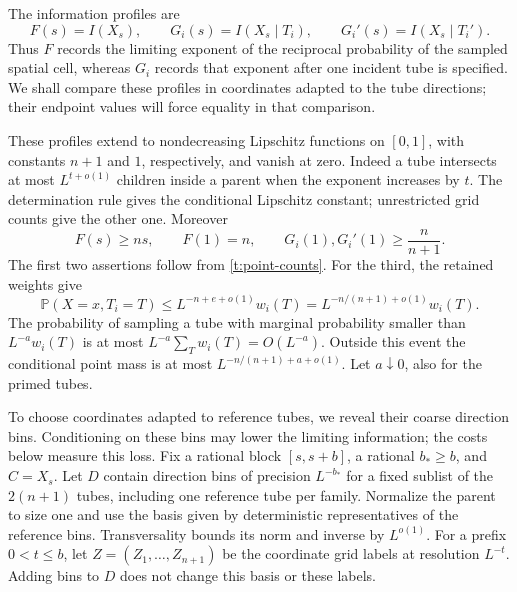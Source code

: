 The information profiles are
\[
 F(s)=I(X_s),\qquad G_i(s)=I(X_s\mid T_i),\qquad
 G_i'(s)=I(X_s\mid T_i').
\]
Thus $F$ records the limiting exponent of the reciprocal probability
of the sampled spatial cell, whereas $G_i$ records that exponent after
one incident tube is specified.  We shall compare these profiles in
coordinates adapted to the tube directions; their endpoint values
will force equality in that comparison.

These profiles extend to nondecreasing Lipschitz functions on $[0,1]$,
with constants $n+1$ and $1$, respectively, and vanish at zero.  Indeed
a tube intersects at most $L^{t+o(1)}$ children inside a parent when
the exponent increases by $t$.  The determination rule gives the
conditional Lipschitz constant; unrestricted grid counts give the
other one.  Moreover
\begin{equation}\label{t:profile-endpoints}
 F(s)\ge ns,\qquad F(1)=n,\qquad
 G_i(1),G_i'(1)\ge\frac n{n+1}.
\end{equation}
The first two assertions follow from \eqref{t:point-counts}.  For the
third, the retained weights give
\[
 \mathbb P(X=x,T_i=T)\le L^{-n+e+o(1)}w_i(T)
       =L^{-n/(n+1)+o(1)}w_i(T).
\]
The probability of sampling a tube with marginal probability smaller
than $L^{-a}w_i(T)$ is at most $L^{-a}\sum_Tw_i(T)=O(L^{-a})$.
Outside this event the conditional point mass is at most
$L^{-n/(n+1)+a+o(1)}$.  Let $a\downarrow0$, also for the primed tubes.

To choose coordinates adapted to reference tubes, we reveal their
coarse direction bins.  Conditioning on these bins may lower the
limiting information; the costs below measure this loss.
Fix a rational block $[s,s+b]$, a rational $b_*\ge b$, and $C=X_s$.
Let $D$ contain direction bins of precision $L^{-b_*}$ for a fixed
sublist of the $2(n+1)$ tubes, including one reference tube per family.
Normalize the parent to size one and use the basis given by deterministic
representatives of the reference bins.  Transversality bounds its norm
and inverse by $L^{o(1)}$.  For a prefix $0<t\le b$, let
$Z=(Z_1,\ldots,Z_{n+1})$ be the coordinate grid labels at resolution
$L^{-t}$.  Adding bins to $D$ does not change this basis or these labels.


